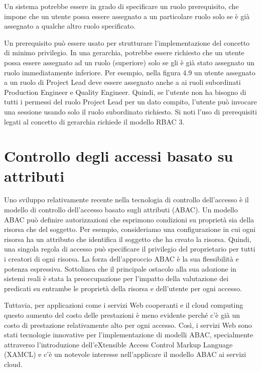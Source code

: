 \singlespacing

Un sistema potrebbe essere in grado di specificare un ruolo prerequisito, che impone che un utente possa essere assegnato a un particolare ruolo solo se è già assegnato a qualche altro ruolo specificato.

\singlespacing

Un prerequisito può essere usato per strutturare l'implementazione del concetto di minimo privilegio. In una gerarchia, potrebbe essere richiesto che un utente possa essere assegnato ad un ruolo (superiore) solo se gli è già stato assegnato un ruolo immediatamente inferiore. Per esempio, nella figura 4.9 un utente assegnato a un ruolo di Project Lead deve essere assegnato anche a ai ruoli subordinati Production Engineer e Quality Engineer. Quindi, se l'utente non ha bisogno di tutti i permessi del ruolo Project Lead per un dato compito, l'utente può invocare una sessione usando solo il ruolo subordinato richiesto. Si noti l'uso di prerequisiti legati al concetto di gerarchia richiede il modello RBAC 3.

\section{Controllo degli accessi basato su attributi}
Uno sviluppo relativamente recente nella tecnologia di controllo dell'accesso è il modello di controllo dell'accesso basato sugli attributi (ABAC). Un modello ABAC può definire autorizzazioni che esprimono condizioni su proprietà sia della risorsa che del soggetto. Per esempio, consideriamo una configurazione in cui ogni risorsa ha un attributo che identifica il soggetto che ha creato la risorsa. Quindi, una singola regola di accesso può specificare il privilegio del proprietario per tutti i creatori di ogni risorsa. La forza dell'approccio ABAC è la sua flessibilità e potenza espressiva. Sottolinea che il principale ostacolo alla sua adozione in sistemi reali è stata la preoccupazione per l'impatto della valutazione dei predicati su entrambe le proprietà della risorsa e dell'utente per ogni accesso.

\singlespacing

Tuttavia, per applicazioni come i servizi Web cooperanti e il cloud computing questo aumento del costo delle prestazioni è meno evidente perché c'è già un costo di prestazione relativamente alto per ogni accesso. Così, i servizi Web sono stati tecnologie innovative per l'implementazione di modelli ABAC, specialmente attraverso l'introduzione dell'eXtensible Access Control Markup Language (XAMCL) e c'è un notevole interesse nell'applicare il modello ABAC ai servizi cloud.

